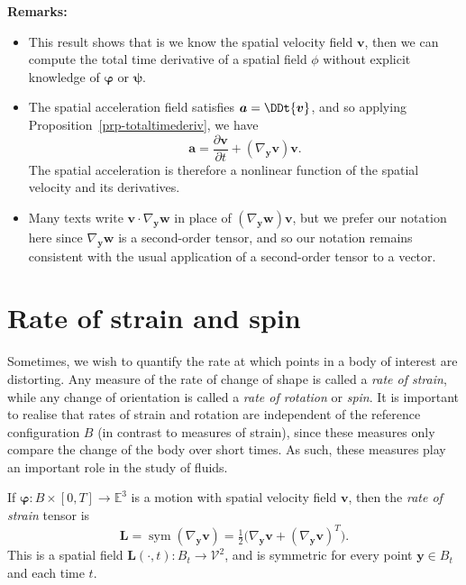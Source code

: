 \documentclass[
  letterpaper,
  DIV=11,
  numbers=noendperiod]{scrreprt}
\theoremstyle{plain}
\theoremstyle{remark}
\begin{document}
\textbf{Remarks:}

\begin{itemize}
\item
  This result shows that is we know the spatial velocity field
  \({\boldsymbol{v}}\), then we can compute the total time derivative of
  a spatial field \(\phi\) without explicit knowledge of
  \({\boldsymbol{\varphi}}\) or \({\boldsymbol{\psi}}\).
\item
  The spatial acceleration field satisfies
  \({\boldsymbol{a}}= \DDt{\boldsymbol{v}}\), and so applying
  Proposition~\ref{prp-totaltimederiv}, we have
  \[{\boldsymbol{a}}= \frac{\partial{\boldsymbol{v}}}{\partial t} +(\nabla_{\boldsymbol{y}}{\boldsymbol{v}}){\boldsymbol{v}}.\]
  The spatial acceleration is therefore a nonlinear function of the
  spatial velocity and its derivatives.
\item
  Many texts write
  \({\boldsymbol{v}}\cdot\nabla_{\boldsymbol{y}}{\boldsymbol{w}}\) in
  place of
  \((\nabla_{\boldsymbol{y}}{\boldsymbol{w}}){\boldsymbol{v}}\), but we
  prefer our notation here since
  \(\nabla_{\boldsymbol{y}}{\boldsymbol{w}}\) is a second-order tensor,
  and so our notation remains consistent with the usual application of a
  second-order tensor to a vector.
\end{itemize}

\section{Rate of strain and spin}\label{rate-of-strain-and-spin}

Sometimes, we wish to quantify the rate at which points in a body of
interest are distorting. Any measure of the rate of change of shape is
called a \emph{rate of strain}, while any change of orientation is
called a \emph{rate of rotation} or \emph{spin}. It is important to
realise that rates of strain and rotation are independent of the
reference configuration \(B\) (in contrast to measures of strain), since
these measures only compare the change of the body over short times. As
such, these measures play an important role in the study of fluids.

If \({\boldsymbol{\varphi}}:B\times[0,T]\to{\mathbb{E}}^3\) is a motion
with spatial velocity field \({\boldsymbol{v}}\), then the \emph{rate of
strain} tensor is
\[{\boldsymbol{L}}= {\operatorname{sym}}(\nabla_{\boldsymbol{y}}{\boldsymbol{v}}) = \tfrac12\big(\nabla_{\boldsymbol{y}}{\boldsymbol{v}}+(\nabla_{\boldsymbol{y}}{\boldsymbol{v}})^T\big).\]
This is a spatial field
\({\boldsymbol{L}}(\cdot,t):B_t\to{\mathcal{V}}^2\), and is symmetric
for every point \({\boldsymbol{y}}\in B_t\) and each time \(t\).
\end{document}
